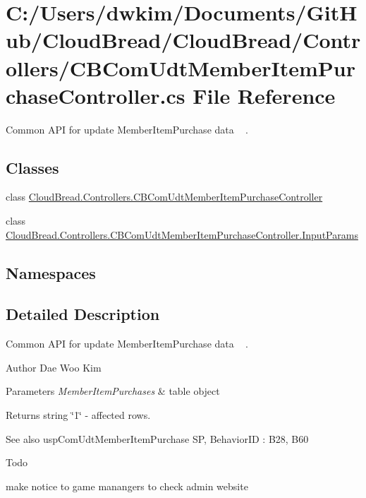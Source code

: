 \hypertarget{a00213}{}\section{C\+:/\+Users/dwkim/\+Documents/\+Git\+Hub/\+Cloud\+Bread/\+Cloud\+Bread/\+Controllers/\+C\+B\+Com\+Udt\+Member\+Item\+Purchase\+Controller.cs File Reference}
\label{a00213}


Common A\+PI for update Member\+Item\+Purchase data ~\newline
.  


\subsection*{Classes}
\begin{DoxyCompactItemize}
\item 
class \hyperlink{a00040}{Cloud\+Bread.\+Controllers.\+C\+B\+Com\+Udt\+Member\+Item\+Purchase\+Controller}
\item 
class \hyperlink{a00112}{Cloud\+Bread.\+Controllers.\+C\+B\+Com\+Udt\+Member\+Item\+Purchase\+Controller.\+Input\+Params}
\end{DoxyCompactItemize}
\subsection*{Namespaces}
\begin{DoxyCompactItemize}
\end{DoxyCompactItemize}


\subsection{Detailed Description}
Common A\+PI for update Member\+Item\+Purchase data ~\newline
. 

\begin{DoxyAuthor}{Author}
Dae Woo Kim 
\end{DoxyAuthor}

\begin{DoxyParams}{Parameters}
{\em Member\+Item\+Purchases} & table object \\
\hline
\end{DoxyParams}
\begin{DoxyReturn}{Returns}
string \char`\"{}1\char`\"{} -\/ affected rows. 
\end{DoxyReturn}
\begin{DoxySeeAlso}{See also}
usp\+Com\+Udt\+Member\+Item\+Purchase SP, Behavior\+ID \+: B28, B60 
\end{DoxySeeAlso}
\begin{DoxyRefDesc}{Todo}
\item[\hyperlink{a00001__todo000004}{Todo}]make notice to game manangers to check admin website \end{DoxyRefDesc}
